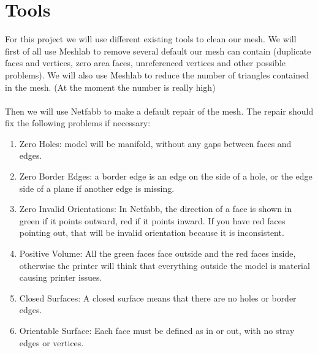 \documentclass[10pt,conference,compsocconf]{IEEEtran}
\begin{document}
\section{Tools}
\label{sec:tools}
For this project we will use different existing tools to clean our mesh. We will first of all use Meshlab to remove several default our mesh can contain (duplicate faces and vertices, zero area faces, unreferenced vertices and other possible problems). We will also use Meshlab to reduce the number of triangles contained in the mesh. (At the moment the number is really high)\\\\
Then we will use Netfabb to make a default repair of the mesh. The repair should fix the following problems if necessary: 
\begin{enumerate}
\item Zero Holes: model will be manifold, without any gaps between faces and edges.
\item Zero Border Edges: a border edge is an edge on the side of a hole, or the edge side of a plane if another edge is missing.
\item Zero Invalid Orientations: In Netfabb, the direction of a face is shown in green if it points outward, red if it points inward. If you have red faces pointing out, that will be invalid orientation because it is inconsistent.
\item Positive Volume: All the green faces face outside and the red faces inside, otherwise the printer will think that everything outside the model is material causing printer issues.
\item Closed Surfaces: A closed surface means that there are no holes or border edges.
\item Orientable Surface: Each face must be defined as in or out, with no stray edges or vertices.
\end{enumerate}
\end{document}
